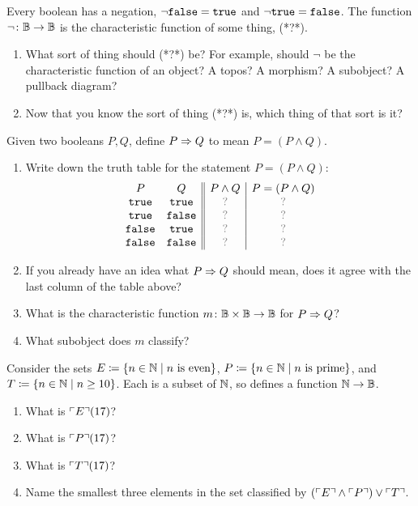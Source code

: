 \documentclass[7Sketches]{subfiles}
\begin{document}
\begin{exercise}%
%
\label{exc.neg_char}
Every boolean has a negation, $\neg\mathtt{false}=\mathtt{true}$ and $\neg\mathtt{true}=\mathtt{false}$. The function $\neg\colon\mathbb{B}\to\mathbb{B}$ is the characteristic function of some thing, (*?*).
\begin{enumerate}
	\item What sort of thing should (*?*) be? For example, should $\neg$ be the characteristic function of an object? A topos? A morphism? A subobject? A pullback diagram?
	\item Now that you know the sort of thing (*?*) is, which thing of that sort is it?
\qedhere
\end{enumerate}
\end{exercise}


\begin{exercise}%
%
\label{exc.implies_char}%
Given two booleans $P,Q$, define $P\Rightarrow Q$ to mean $P=(P\wedge Q)$.
\begin{enumerate}
	\item Write down the truth table for the statement $P=(P\wedge Q)$:
	\[
	\begin{array}{cc||c|c}
		P&Q&P\wedge Q&P=(P\wedge Q)\\
		\true&\true&\?&\?\\
		\true&\false&\?&\?\\
		\false&\true&\?&\?\\
		\false&\false&\?&\?\\
	\end{array}
	\]
	\item If you already have an idea what $P\Rightarrow Q$ should mean, does it agree with the last column of the table above?
	\item What is the characteristic function $m\colon \mathbb{B}\times\mathbb{B}\to\mathbb{B}$ for $P\Rightarrow Q$?
	\item What subobject does $m$ classify?
\qedhere
\end{enumerate}
\end{exercise}


\begin{exercise}%
\label{exc.even_prime_10}
Consider the sets $E\coloneqq\{n\in\mathbb{N}\mid n\text{ is even}\}$, $P\coloneqq\{n\in\mathbb{N}\mid n\text{ is prime}\}$, and $T\coloneqq\{n\in\mathbb{N}\mid n\geq 10\}$. Each is a subset of $\mathbb{N}$, so defines a function $\mathbb{N}\to\mathbb{B}$.
\begin{enumerate}
	\item What is $\ulcorner E\urcorner(17)$?
	\item What is $\ulcorner P\urcorner(17)$?
	\item What is $\ulcorner T\urcorner(17)$?
	\item Name the smallest three elements in the set classified by $(\ulcorner E\urcorner\wedge\ulcorner P\urcorner)\vee\ulcorner T\urcorner$.
\qedhere
\end{enumerate}
\end{exercise}
\end{document}
